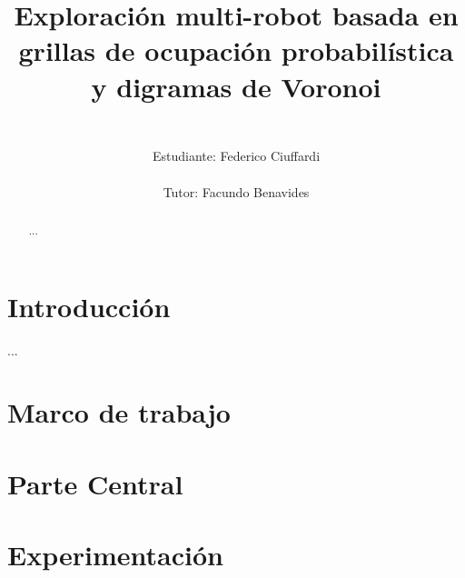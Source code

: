 \documentclass{report}
\title{%
\begin{figure}[H]
\vspace{-2.5cm}
  \subfloat{\hspace{0.075\textwidth}}
  \subfloat{\texttt{[image: logos/udelar.jpg]}}
  \subfloat{\hspace{0.2\textwidth}}
  \subfloat{\texttt{[image: logos/logo-fing.png]}}
  \subfloat{\hspace{0.2\textwidth}}
  \subfloat{\texttt{[image: logos/inco.png]}}
\end{figure}
\vspace{0.25cm}
\huge
Exploración multi-robot basada en grillas de ocupación probabilística y digramas de Voronoi\\
}
\author{%
\Large
\vspace{0.5cm}\\
Estudiante: Federico Ciuffardi\\
\vspace{0.5cm}\\
Tutor: Facundo Benavides%
}
\date{}
\renewcommand\_{\textunderscore\allowbreak}
\begin{document}
\maketitle

\thispagestyle{empty}
\setcounter{page}{1}

\begin{abstract}    %
    ...
\end{abstract}

\hfuzz=10pt 
\tableofcontents
\hfuzz=0pt 

\listoffigures  %
\listoftables   %
\listofalgorithms %

\chapter{Introducción}  %
...

\chapter{Marco de trabajo}
\hfuzz=10pt 
\minitoc
\hfuzz=0pt 





\chapter{Parte Central}
\hfuzz=10pt 
\minitoc
\hfuzz=0pt 



\chapter{Experimentación}
\hfuzz=10pt 
\minitoc
\hfuzz=0pt 



\begin{appendices}

\end{appendices}



\end{document}
